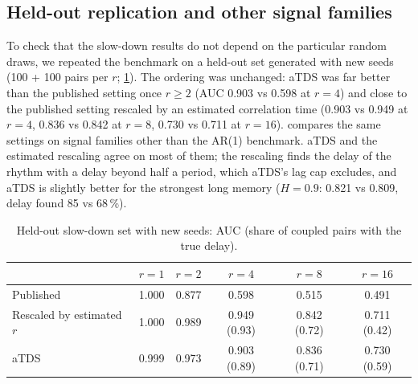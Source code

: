\documentclass[11pt,a4paper]{article}
\begin{document}
\subsection{Held-out replication and other signal families}
\label{sec:res-heldout}
To check that the slow-down results do not depend on the particular random draws, we repeated the benchmark on a held-out set generated with new seeds (100 + 100 pairs per $r$; \cref{tab:heldout}). The ordering was unchanged: aTDS was far better than the published setting once $r \ge 2$ (AUC 0.903 vs 0.598 at $r = 4$) and close to the published setting rescaled by an estimated correlation time (0.903 vs 0.949 at $r = 4$, 0.836 vs 0.842 at $r = 8$, 0.730 vs 0.711 at $r = 16$).  compares the same settings on signal families other than the AR(1) benchmark. aTDS and the estimated rescaling agree on most of them; the rescaling finds the delay of the rhythm with a delay beyond half a period, which aTDS's lag cap excludes, and aTDS is slightly better for the strongest long memory ($H = 0.9$: 0.821 vs 0.809, delay found 85 vs 68\,\%).

\begin{table}[t]
\centering
\caption{Held-out slow-down set with new seeds: AUC (share of coupled pairs with the true delay).}
\label{tab:heldout}
\footnotesize
\begin{tabular}{lccccc}
\toprule
 & $r = 1$ & $r = 2$ & $r = 4$ & $r = 8$ & $r = 16$ \\
\midrule
Published & 1.000 & 0.877 & 0.598 & 0.515 & 0.491 \\
Rescaled by estimated $r$ & 1.000 & 0.989 & 0.949 (0.93) & 0.842 (0.72) & 0.711 (0.42) \\
aTDS & 0.999 & 0.973 & 0.903 (0.89) & 0.836 (0.71) & 0.730 (0.59) \\
\bottomrule
\end{tabular}
\end{table}
\end{document}
